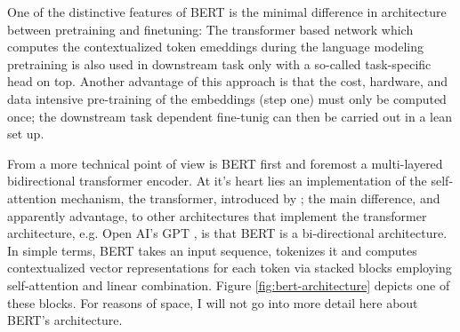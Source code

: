 One of the distinctive features of BERT is the minimal difference in architecture between
pretraining and finetuning: The transformer based network which computes the contextualized
token emeddings during the language modeling pretraining is also used in downstream task only
with a so-called task-specific head on top.
Another advantage of this approach is that the cost, hardware, and data intensive pre-training of the
embeddings (step one) must only be computed once; the downstream task dependent fine-tunig can then
be carried out in a lean set up.

From a more technical point of view is BERT first and foremost a multi-layered bidirectional
transformer encoder. At it's heart lies an implementation of the self-attention mechanism, the
transformer, introduced by \cite{vaswani2017attention}; the main difference, and apparently
advantage, to other architectures that implement the transformer architecture, e.g. Open AI's GPT
\citep{radford2018improving}, is that BERT is a bi-directional architecture. In simple terms,
BERT takes an input sequence, tokenizes it and computes contextualized vector representations
for each token via stacked blocks employing self-attention and linear combination. Figure
\ref{fig:bert-architecture} depicts one of these blocks. For reasons of space, I will not go into
more detail here about BERT's architecture.


